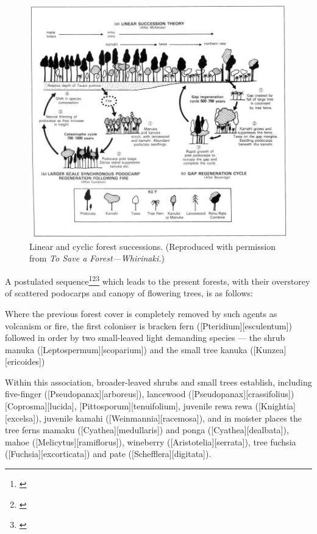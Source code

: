 \begin{figure}[htb]
	\centering
	\includegraphics[width=\textwidth]{graphics/figure64forestsuccession.jpg}
	\caption[Linear and cyclic forest successions]{Linear and cyclic forest successions. (Reproduced with permission from \emph{To Save a Forest---Whirinaki.})}%
	\label{fig:64forestsuccession}
\end{figure}

A postulated sequence\footnote{\cite{cockayne1928vegetation}}\footnote{\cite{mckelvey1963synecology}}\footnote{\cite{mckelvey1973pattern}} which leads to the present forests, with their overstorey of scattered podocarps and canopy of flowering trees, is as follows:

Where the previous forest cover is completely removed by such agents as volcanism or fire, the first coloniser is bracken fern ([Pteridium][esculentum]) followed in order by two small-leaved light demanding species --- the shrub manuka ([Leptospermum][scoparium]) and the small tree kanuka ([Kunzea][ericoides])

Within this association, broader-leaved shrubs and small trees establish, including five-finger ([Pseudopanax][arboreus]), lancewood ([Pseudopanax][crassifolius]) [Coprosma][lucida], [Pittosporum][tenuifolium], juvenile rewa rewa ([Knightia][excelsa]), juvenile kamahi ([Weinmannia][racemosa]), and in moister places the tree ferns mamaku ([Cyathea][medullaris]) and ponga ([Cyathea][dealbata]), mahoe ([Melicytus][ramiflorus]), wineberry ([Aristotelia][serrata]), tree fuchsia ([Fuchsia][excorticata]) and pate ([Schefflera][digitata]).

